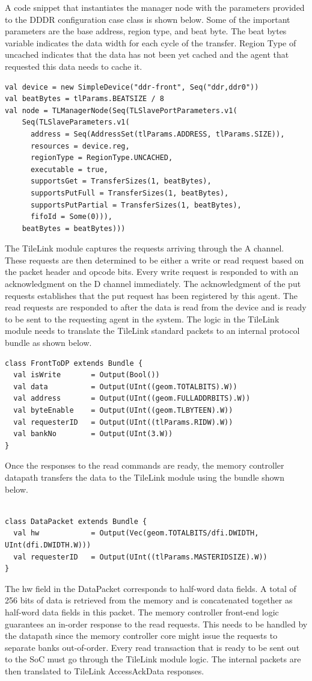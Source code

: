 A code snippet that instantiates the manager node with the parameters provided to the DDDR configuration case class is shown below. Some of the important parameters are the base address, region type, and beat byte. The beat bytes variable indicates the data width for each cycle of the transfer. Region Type of uncached indicates that the data has not been yet cached and the agent that requested this data needs to cache it. 
\begin{verbatim}
val device = new SimpleDevice("ddr-front", Seq("ddr,ddr0"))
val beatBytes = tlParams.BEATSIZE / 8
val node = TLManagerNode(Seq(TLSlavePortParameters.v1(
    Seq(TLSlaveParameters.v1(
      address = Seq(AddressSet(tlParams.ADDRESS, tlParams.SIZE)),
      resources = device.reg,
      regionType = RegionType.UNCACHED,
      executable = true,
      supportsGet = TransferSizes(1, beatBytes),
      supportsPutFull = TransferSizes(1, beatBytes),
      supportsPutPartial = TransferSizes(1, beatBytes),
      fifoId = Some(0))),
    beatBytes = beatBytes)))
\end{verbatim}

The TileLink module captures the requests arriving through the A channel. These requests are then determined to be either a write or read request based on the packet header and opcode bits. Every write request is responded to with an acknowledgment on the D channel immediately. The acknowledgment of the put requests establishes that the put request has been registered by this agent. The read requests are responded to after the data is read from the device and is ready to be sent to the requesting agent in the system. The logic in the TileLink module needs to translate the TileLink standard packets to an internal protocol bundle as shown below. 
\begin{verbatim}
class FrontToDP extends Bundle {
  val isWrite       = Output(Bool())
  val data          = Output(UInt((geom.TOTALBITS).W))
  val address       = Output(UInt((geom.FULLADDRBITS).W))
  val byteEnable    = Output(UInt((geom.TLBYTEEN).W))
  val requesterID   = Output(UInt((tlParams.RIDW).W))
  val bankNo        = Output(UInt(3.W))
}
\end{verbatim}
Once the responses to the read commands are ready, the memory controller datapath transfers the data to the TileLink module using the bundle shown below. 
\begin{verbatim}
    
class DataPacket extends Bundle {
  val hw            = Output(Vec(geom.TOTALBITS/dfi.DWIDTH, UInt(dfi.DWIDTH.W)))
  val requesterID   = Output(UInt((tlParams.MASTERIDSIZE).W))
}
\end{verbatim}
The hw field in the DataPacket corresponds to half-word data fields. A total of 256 bits of data is retrieved from the memory and is concatenated together as half-word data fields in this packet. The memory controller front-end logic guarantees an in-order response to the read requests. This needs to be handled by the datapath since the memory controller core might issue the requests to separate banks out-of-order. Every read transaction that is ready to be sent out to the SoC must go through the TileLink module logic. The internal packets are then translated to TileLink AccessAckData responses.
